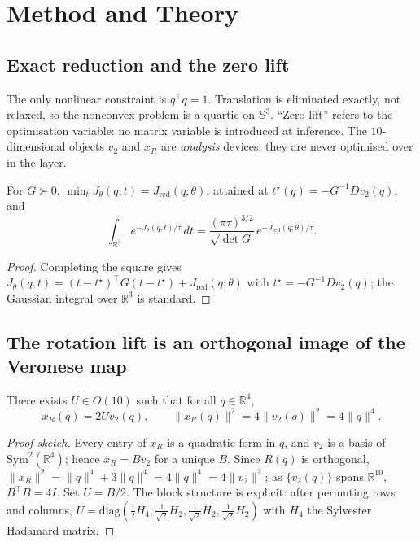 \section{Method and Theory}\label{sec:method}

\subsection{Exact reduction and the zero lift}\label{sec:reduction}

The only nonlinear constraint is $q^\top q=1$. Translation is eliminated exactly, not relaxed, so the nonconvex problem is a quartic on $\mathbb{S}^3$. ``Zero lift'' refers to the optimisation variable: no matrix variable is introduced at inference. The $10$-dimensional objects $v_2$ and $x_R$ are \emph{analysis} devices; they are never optimised over in the layer.

\begin{lemma}\label{lem:translation}
For $G\succ0$, $\min_t J_\theta(q,t)=J_{\mathrm{red}}(q;\theta)$, attained at $t^\star(q)=-G^{-1}Dv_2(q)$, and
\begin{equation}
\int_{\mathbb{R}^3}e^{-J_\theta(q,t)/\tau}\,dt=\frac{(\pi\tau)^{3/2}}{\sqrt{\det G}}\,e^{-J_{\mathrm{red}}(q;\theta)/\tau}.
\label{eq:gaussint}
\end{equation}
\end{lemma}

\begin{proof}
Completing the square gives $J_\theta(q,t)=(t-t^\star)^\top G(t-t^\star)+J_{\mathrm{red}}(q;\theta)$ with $t^\star=-G^{-1}Dv_2(q)$; the Gaussian integral over $\mathbb{R}^3$ is standard.
\end{proof}

\subsection{The rotation lift is an orthogonal image of the Veronese map}\label{sec:lift}

\begin{theorem}\label{thm:lift}
There exists $U\in O(10)$ such that for all $q\in\mathbb{R}^4$,
\begin{equation}
x_R(q)=2Uv_2(q),\qquad \|x_R(q)\|^2=4\|v_2(q)\|^2=4\|q\|^4 .
\label{eq:bridge}
\end{equation}
\end{theorem}

\begin{proof}[Proof sketch]
Every entry of $x_R$ is a quadratic form in $q$, and $v_2$ is a basis of $\mathrm{Sym}^2(\mathbb{R}^4)$; hence $x_R=Bv_2$ for a unique $B$. Since $R(q)$ is orthogonal, $\|x_R\|^2=\|q\|^4+3\|q\|^4=4\|q\|^4=4\|v_2\|^2$; as $\{v_2(q)\}$ spans $\mathbb{R}^{10}$, $B^\top B=4I$. Set $U=B/2$. The block structure is explicit: after permuting rows and columns, $U=\mathrm{diag}(\tfrac12H_4,\tfrac1{\sqrt2}H_2,\tfrac1{\sqrt2}H_2,\tfrac1{\sqrt2}H_2)$ with $H_4$ the Sylvester Hadamard matrix.
\end{proof}

